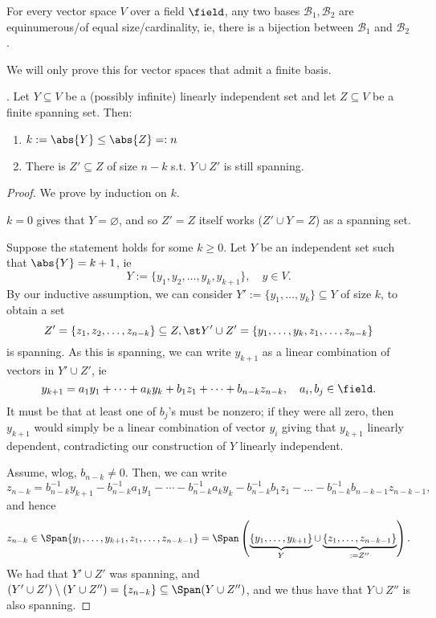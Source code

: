 \begin{theorem}\label{thm:basesofequalcardinality}
    For every vector space $V$ over a field $\field$, any two bases $\mathcal{B}_1,\mathcal{B}_2$ are equinumerous/of equal size/cardinality, ie, there is a bijection between $\mathcal{B}_1$ and $\mathcal{B}_2$.
\end{theorem}

\begin{remark}
    We will only prove this for vector spaces that admit a finite basis.
\end{remark}

\begin{lemma}\label{lemma:steinitz}
     . Let $Y \subseteq V$ be a (possibly infinite) linearly independent set and let $Z \subseteq V$ be a finite spanning set. Then:
    \begin{enumerate}
        \item $k:=\abs{Y} \leq \abs{Z} =: n$
        \item There is $Z' \subseteq Z$ of size $n -k$ s.t. $Y \cup Z'$ is still spanning.
    \end{enumerate}
\end{lemma}

\begin{proof}
    We prove by induction on $k$.

    $k = 0$ gives that $Y = \varnothing$, and so $Z' = Z$ itself works ($Z' \cup Y = Z$) as a spanning set.

    Suppose the statement holds for some $k \geq 0$. Let $Y$ be an independent set such that $\abs{Y} = k + 1$, ie \[
    Y := \{y_1, y_2, \dots, y_k, y_{k+1}\}, \quad y \in V.
    \]
    By our inductive assumption, we can consider $Y' := \{y_1, \dots, y_k\} \subseteq Y$ of size $k$, to obtain a set \[
    Z' = \{z_1, z_2, \dots, z_{n-k}\} \subseteq Z, \st Y' \cup Z' = \{y_1, \dots, y_k, z_1, \dots, z_{n-k}\}
    \]
    is spanning. As this is spanning, we can write $y_{k+1}$ as a linear combination of vectors in $Y' \cup Z'$, ie \[
    y_{k+1} = a_1 y_1 + \dots + a_k y_k + b_1 z_1 + \dots + b_{n-k} z_{n-k}, \quad a_i, b_j \in \field.
    \]
    It must be that at least one of $b_j$'s must be nonzero; if they were all zero, then $y_{k+1}$ would simply be a linear combination of vector $y_i$ giving that $y_{k+1}$ linearly dependent, contradicting our construction of $Y$ linearly independent.

    Assume, wlog, $b_{n-k} \neq 0$. Then, we can write \[
    z_{n-k} = b_{n-k}^{-1}y_{k+1}-b_{n-k}^{-1}a_1y_{1}-\cdots - b_{n-k}^{-1}a_ky_k - b_{n-k}^{-1}b_1 z_1 - \dots - b_{n-k}^{-1}b_{n-k-1}z_{n-k-1},    
    \]
    and hence $$z_{n-k} \in \Span \{y_1, \dots, y_{k+1}, z_1, \dots, z_{n-k-1}\} = \Span \left(\underbrace{\{y_1, \dots, y_{k+1}\}}_{Y} \cup \underbrace{\{z_1, \dots, z_{n-k-1}\}}_{:= Z''} \right).$$
    We had that $Y' \cup Z'$ was spanning, and $(Y' \cup Z') \setminus (Y \cup Z'') = \{z_{n-k}\} \subseteq \Span (Y \cup Z'')$, and we thus have that $Y \cup Z''$ is also spanning.
\end{proof}

